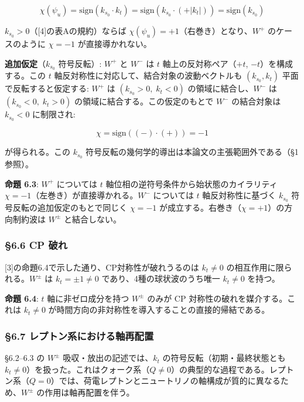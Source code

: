 \documentclass[
  a4paper,11pt]{ltjsarticle}
\theoremstyle{definition}
\theoremstyle{remark}
\begin{document}
\[\chi(\psi_u) = \mathrm{sign}(k_{s_0} \cdot k_t) = \mathrm{sign}(k_{s_0} \cdot (+|k_t|)) = \mathrm{sign}(k_{s_0})\]

\(k_{s_0} > 0\)（{[}4{]}の表Aの規約）ならば
\(\chi(\psi_u) = +1\)（右巻き）となり、\(W^+\) のケースのように
\(\chi = -1\) が直接導かれない。

\textbf{追加仮定}（\(k_{s_0}\) 符号反転）: \(W^+\) と \(W^-\) は \(t\)
軸上の反対称ペア（\(+t\), \(-t\)）を構成する。この \(t\)
軸反対称性に対応して、結合対象の波動ベクトルも \((k_{s_0}, k_t)\)
平面で反転すると仮定する: \(W^+\) は \((k_{s_0} > 0,\; k_t < 0)\)
の領域に結合し、\(W^-\) は \((k_{s_0} < 0,\; k_t > 0)\)
の領域に結合する。この仮定のもとで \(W^-\) の結合対象は \(k_{s_0} < 0\)
に制限され:

\[\chi = \mathrm{sign}((-) \cdot (+)) = -1\]

が得られる。この \(k_{s_0}\)
符号反転の幾何学的導出は本論文の主張範囲外である（§1参照）。

\textbf{命題 6.3}: \(W^+\) については \(t\)
軸位相の逆符号条件から始状態のカイラリティ
\(\chi = -1\)（左巻き）が直接導かれる。\(W^-\) については \(t\)
軸反対称性に基づく \(k_{s_0}\) 符号反転の追加仮定のもとで同じく
\(\chi = -1\) が成立する。右巻き（\(\chi = +1\)）の方向制約波は
\(W^{\pm}\) と結合しない。

\subsubsection{§6.6 CP 破れ}\label{cp-ux7834ux308c}

{[}3{]}の命題6.4で示した通り、CP対称性が破れうるのは \(k_t \neq 0\)
の相互作用に限られる。\(W^{\pm}\) は \(k_t = \pm 1 \neq 0\)
であり、4種の球状波のうち唯一 \(k_t \neq 0\) を持つ。

\textbf{命題 6.4}: \(t\) 軸に非ゼロ成分を持つ \(W^{\pm}\) のみが CP
対称性の破れを媒介する。これは \(k_t \neq 0\)
が時間方向の非対称性を導入することの直接的帰結である。

\subsubsection{§6.7
レプトン系における軸再配置}\label{ux30ecux30d7ux30c8ux30f3ux7cfbux306bux304aux3051ux308bux8ef8ux518dux914dux7f6e}

§6.2--6.3 の \(W^{\pm}\) 吸収・放出の記述では、\(k_t\)
の符号反転（初期・最終状態とも
\(k_t \neq 0\)）を扱った。これはクォーク系（\(Q \neq 0\)）の典型的な過程である。レプトン系（\(Q = 0\)）では、荷電レプトンとニュートリノの軸構成が質的に異なるため、\(W^{\pm}\)
の作用は軸再配置を伴う。
\end{document}
